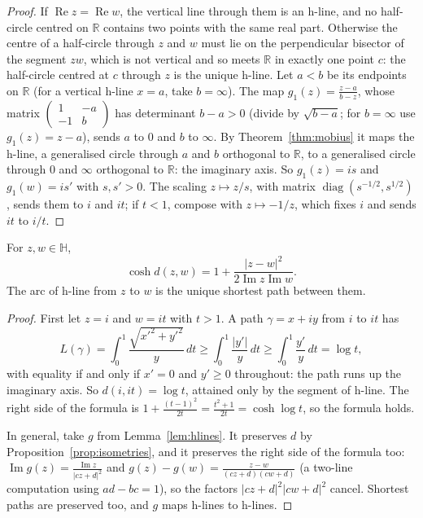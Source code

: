 \begin{proof}
If $\operatorname{Re}z=\operatorname{Re}w$, the vertical line through them is an h-line, and no half-circle centred on $\mathbb R$ contains two points with the
same real part. Otherwise the centre of a half-circle through $z$ and $w$ must lie on the perpendicular bisector of the segment $zw$, which is not vertical
and so meets $\mathbb R$ in exactly one point $c$: the half-circle centred at $c$ through $z$ is the unique h-line. Let $a<b$ be its endpoints on
$\mathbb R$ (for a vertical h-line $x=a$, take $b=\infty$). The map $g_1(z)=\frac{z-a}{b-z}$, whose matrix $\begin{pmatrix}1&-a\\-1&b\end{pmatrix}$ has
determinant $b-a>0$ (divide by $\sqrt{b-a}$; for $b=\infty$ use $g_1(z)=z-a$), sends $a$ to $0$ and $b$ to $\infty$. By Theorem~\ref{thm:mobius} it maps the h-line,
a generalised circle through $a$ and $b$ orthogonal to $\mathbb R$, to a generalised circle through $0$ and $\infty$ orthogonal to $\mathbb R$: the imaginary axis.
So $g_1(z)=is$ and $g_1(w)=is'$ with $s,s'>0$. The scaling $z\mapsto z/s$, with matrix $\operatorname{diag}(s^{-1/2},s^{1/2})$, sends them to $i$ and $it$; if
$t<1$, compose with $z\mapsto-1/z$, which fixes $i$ and sends $it$ to $i/t$.
\end{proof}

\begin{theorem}\label{thm:hypdist}
For $z,w\in\mathbb H$,
\[
\cosh d(z,w)=1+\frac{|z-w|^2}{2\operatorname{Im}z\operatorname{Im}w}.
\]
The arc of h-line from $z$ to $w$ is the unique shortest path between them.
\end{theorem}

\begin{proof}
First let $z=i$ and $w=it$ with $t>1$. A path $\gamma=x+iy$ from $i$ to $it$ has
\[
L(\gamma)=\int_0^1\frac{\sqrt{x'^2+y'^2}}y\,dt\ge\int_0^1\frac{|y'|}y\,dt\ge\int_0^1\frac{y'}y\,dt=\log t,
\]
with equality if and only if $x'=0$ and $y'\ge0$ throughout: the path runs up the imaginary axis. So $d(i,it)=\log t$, attained only by the segment of
h-line. The right side of the formula is $1+\frac{(t-1)^2}{2t}=\frac{t^2+1}{2t}=\cosh\log t$, so the formula holds.

In general, take $g$ from Lemma~\ref{lem:hlines}. It preserves $d$ by Proposition~\ref{prop:isometries}, and it preserves the right side of the formula too:
$\operatorname{Im}g(z)=\frac{\operatorname{Im}z}{|cz+d|^2}$ and $g(z)-g(w)=\frac{z-w}{(cz+d)(cw+d)}$ (a two-line computation using $ad-bc=1$), so the factors
$|cz+d|^2|cw+d|^2$ cancel. Shortest paths are preserved too, and $g$ maps h-lines to h-lines.
\end{proof}

